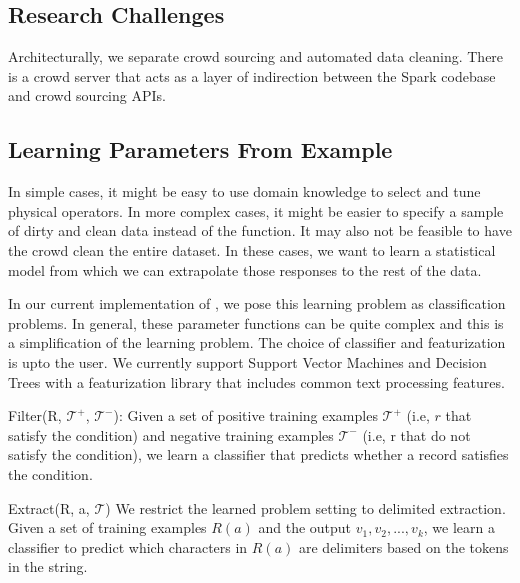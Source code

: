\iffalse
\subsection{Research Challenges}

Architecturally, we separate crowd sourcing and automated data cleaning.
There is a crowd server that acts as a layer of indirection between the Spark codebase and crowd sourcing APIs.




\subsection{Learning Parameters From Example}
In simple cases, it might be easy to use domain knowledge to select and tune physical operators. 
In more complex cases, it might be easier to specify a sample of dirty and clean data instead of the function.
It may also not be feasible to have the crowd clean the entire dataset.
In these cases, we want to learn a statistical model from which we can extrapolate those responses to the rest 
of the data.

In our current implementation of \projx, we pose this learning problem as classification problems.
In general, these parameter functions can be quite complex and this is a simplification of the learning problem.
The choice of classifier and featurization is upto the user. 
We currently support Support Vector Machines and Decision Trees with a featurization library that includes common text processing features.

\vspace{0.5em}

\noindent \textsf{Filter(R, $\mathcal{T}^+$, $\mathcal{T}^-$)}: Given a set of positive training examples $\mathcal{T}^+$ (i.e, $r$ that satisfy the condition) and
negative training examples $\mathcal{T}^-$ (i.e, r that do not satisfy the condition), we learn a classifier that predicts whether a record satisfies the condition. 

\vspace{0.5em}

\noindent \textsf{Extract(R, a, $\mathcal{T}$)} We restrict the learned problem setting to delimited extraction. Given a set of training examples $R(a)$ and the output $v_1,v_2,...,v_k$, we learn a classifier to predict which characters in $R(a)$ are delimiters based on the tokens in the string.

